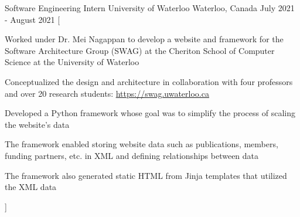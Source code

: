 \begin{cventries}
  \cventry
    {Software Engineering Intern} %
    {University of Waterloo} %
    {Waterloo, Canada} %
    {July 2021 - August 2021} %
    [
      \begin{cvitems} %
        \item {Worked under Dr. Mei Nagappan to develop a website and framework for the Software Architecture Group (SWAG) at the Cheriton School of Computer Science at the University of Waterloo}
        \item {Conceptualized the design and architecture in collaboration with four professors and over 20 research students: \href{https://swag.uwaterloo.ca}{https://swag.uwaterloo.ca}}
        \item {Developed a Python framework whose goal was to simplify the process of scaling the website's data}
        \item {The framework enabled storing website data such as publications, members, funding partners, etc. in XML and defining relationships between data}
        \item {The framework also generated static HTML from Jinja templates that utilized the XML data}
      \end{cvitems}
    ]


\end{cventries}
